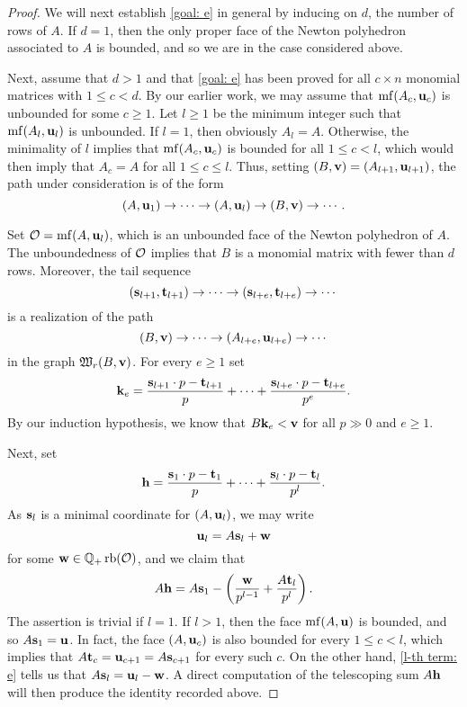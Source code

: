 \documentclass[11pt]{amsart}
\begin{document}
\begin{proof}
We will next establish \eqref{goal: e} in general by inducing on $d$, the number of rows of $A$.    If $d=1$, then the only proper face of the Newton polyhedron associated to $A$ is bounded, and so we are in the case considered above.    

Next, assume that $d>1$ and that \eqref{goal: e} has been proved for all $c \times n$ monomial matrices with $1 \leq c < d$.    By our earlier work, we may assume that $\operatorname{mf}(A_c, \mathbf{u}_c)$ is unbounded for some $c \geq 1$.  Let $l \geq 1$ be the minimum integer such that $\operatorname{mf}(A_l, \mathbf{u}_l)$ is unbounded.  If $l=1$, then obviously $A_l = A$. Otherwise, the minimality of $l$ implies that $\operatorname{mf}(A_c, \mathbf{u}_c)$ is bounded for all $1 \leq c < l$, which would then imply that $A_c = A$ for all $1 \leq c \leq l$.  Thus, setting $(B, \mathbf{v}) = (A_{l+1}, \mathbf{u}_{l+1})$, the path under consideration is of the form \[ (A, \mathbf{u}_1) \to \cdots \to (A, \mathbf{u}_l) \to (B, \mathbf{v}) \to \cdots. \]

 Set  $\mathcal{O} = \operatorname{mf}(A, \mathbf{u}_l)$, which is an unbounded face of the Newton polyhedron of $A$.  The unboundedness of $\mathcal{O}$ implies that $B$  is a monomial matrix with fewer than $d$ rows.  Moreover, the tail sequence 
\[ (\mathbf{s}_{l+1}, \mathbf{t}_{l+1}) \to \cdots \to (\mathbf{s}_{l+e}, \mathbf{t}_{l+e}) \to \cdots \] is a realization of the path \[ (B, \mathbf{v}) \to \cdots \to (A_{l+e}, \mathbf{u}_{l+e}) \to \cdots \] in the graph $\mathfrak{W}_r(B, \mathbf{v})$.  For every $e \geq 1$ set \[ \mathbf{k}_e = \frac{ \mathbf{s}_{l+1} \cdot p - \mathbf{t}_{l+1}}{p} + \cdots + \frac{ \mathbf{s}_{l+e} \cdot p - \mathbf{t}_{l+e}}{p^e}.  \]   By our induction hypothesis, we know that $B \mathbf{k}_e < \mathbf{v}$ for all $p \gg 0$ and $e \geq 1$.

Next, set \[ \mathbf{h} = \frac{\mathbf{s}_1 \cdot p - \mathbf{t}_1}{p} + \cdots + \frac{ \mathbf{s}_l \cdot p - \mathbf{t}_l}{p^l}. \] 
As $\mathbf{s}_l$ is a minimal coordinate for $(A, \mathbf{u}_l)$, we may write 
%
\begin{equation}
 \label{l-th term: e}
 \mathbf{u}_l = A \mathbf{s}_l + \mathbf{w}
 \end{equation}
 for some $\mathbf{w} \in \mathbb{Q}_+ \operatorname{rb}(\mathcal{O})$, and we claim that   
\begin{equation} 
\label{A telescoping: e}
A \mathbf{h} = A \mathbf{s}_1 - \left( \frac{\mathbf{w}}{p^{l-1}} + \frac{A \mathbf{t}_l}{p^l} \right).  
\end{equation}  
The assertion is trivial if $l =1$.  If $l > 1$, then the face $\operatorname{mf}(A, \mathbf{u})$ is bounded, and so $A \mathbf{s}_1 = \mathbf{u}$.  In fact,  the face $(A, \mathbf{u}_c)$ is also bounded for every $1 \leq c < l$, which implies that $A \mathbf{t}_c = \mathbf{u}_{c+1} = A \mathbf{s}_{c+1}$ for every such $c$.  On the other hand, \eqref{l-th term: e} tells us that $A \mathbf{s}_l = \mathbf{u}_l - \mathbf{w}$.  A direct computation of the telescoping sum $A \mathbf{h}$ will then produce the identity recorded above.  


\end{proof}
\end{document}
